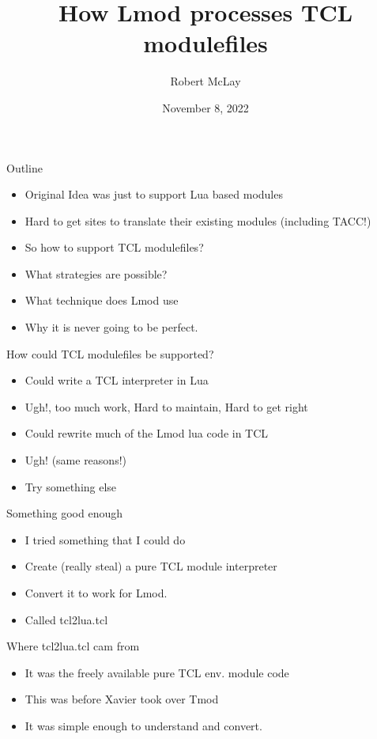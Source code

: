\documentclass{beamer}
\begin{document}
\title[Lmod]{How Lmod processes TCL modulefiles}
\author{Robert McLay} 
\date{November 8, 2022}

\frame{\titlepage} 


\begin{frame}{Outline}
  \begin{itemize}
    \item Original Idea was just to support Lua based modules
    \item Hard to get sites to translate their existing modules
      (including TACC!)
    \item So how to support TCL modulefiles?
    \item What strategies are possible?
    \item What technique does Lmod use
    \item Why it is never going to be perfect.
  \end{itemize}
\end{frame}

\begin{frame}{How could TCL modulefiles be supported?}
  \begin{itemize}
    \item Could write a TCL interpreter in Lua
    \item Ugh!, too much work, Hard to maintain, Hard to get right
    \item Could rewrite much of the Lmod lua code in TCL
    \item Ugh! (same reasons!)
    \item Try something else
  \end{itemize}
\end{frame}

\begin{frame}{Something good enough}
  \begin{itemize}
    \item I tried something that I could do
    \item Create (really steal) a pure TCL module interpreter
    \item Convert it to work for Lmod.
    \item Called tcl2lua.tcl
  \end{itemize}
\end{frame}


\begin{frame}{Where tcl2lua.tcl cam from}
  \begin{itemize}
    \item It was the freely available pure TCL env. module code
    \item This was before Xavier took over Tmod
    \item It was simple enough to understand and convert.
  \end{itemize}
\end{frame}
\end{document}

